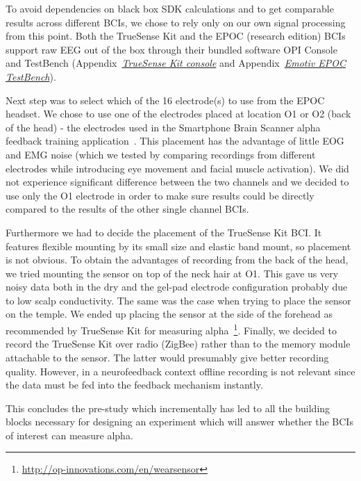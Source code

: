 \documentclass[a4paper,10pt,english,lof,lot,twoside]{puthesis}
\begin{document}
To avoid dependencies on black box SDK calculations and to get comparable
results across different BCIs, we chose to rely only on our own signal
processing from this point.  Both the TrueSense Kit and the EPOC (research
edition) BCIs support raw EEG out of the box through their bundled software OPI
Console and TestBench (Appendix {\hyperref[appendix_background_truesense_console:appendix-background-truesense-console]{\emph{TrueSense Kit console}}} and Appendix {\hyperref[appendix_background_testbench:appendix-background-testbench]{\emph{Emotiv EPOC TestBench}}}).

Next step was to select which of the 16 electrode(s) to use from the EPOC
headset. We chose to use one of the electrodes placed at location O1 or O2 (back
of the head) - the electrodes used in the Smartphone Brain Scanner alpha
feedback training application \cite{stopczynski_smartphones_2013}. This placement has the advantage of
little EOG and EMG noise (which we tested by comparing recordings from different
electrodes while introducing eye movement and facial muscle activation). We did
not experience significant difference between the two channels and we decided to
use only the O1 electrode in order to make sure results could be directly
compared to the results of the other single channel BCIs.

Furthermore we had to decide the placement of the TrueSense Kit BCI. It features
flexible mounting by its small size and elastic band mount, so placement is not
obvious. To obtain the advantages of recording from the back of the head, we
tried mounting the sensor on top of the neck hair at O1. This gave us very noisy
data both in the dry and the gel-pad electrode configuration probably due to low
scalp conductivity. The same was the case when trying to place the sensor on the
temple. We ended up placing the sensor at the side of the forehead as
recommended by TrueSense Kit for measuring alpha \footnote{
\href{http://op-innovations.com/en/wearsensor}{http://op-innovations.com/en/wearsensor}
}. Finally, we decided to record the TrueSense
Kit over radio (ZigBee) rather than to the memory module attachable to the
sensor. The latter would presumably give better
recording quality. However, in a neurofeedback context offline
recording is not relevant since the data must be fed into the feedback
mechanism instantly.

This concludes the pre-study which incrementally has led to all the building
blocks necessary for designing an experiment which will answer whether the BCIs
of interest can measure alpha.
\end{document}
